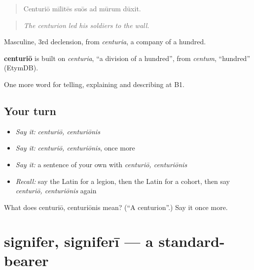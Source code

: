 \begin{quote}
Centuriō mīlitēs suōs ad mūrum dūxit.
\end{quote}

\begin{quote}
\emph{The centurion led his soldiers to the wall.}
\end{quote}

Masculine, 3rd declension, from \emph{centuria}, a company of a hundred.

\begin{cousinweb}
\textbf{centuriō} is built on \emph{centuria}, \textquotedblleft{}a division of a hundred\textquotedblright{}, from \emph{centum}, \textquotedblleft{}hundred\textquotedblright{} (EtymDB).
\end{cousinweb}

\begin{grammarlens}[title={What you've built}]
One more word for telling, explaining and describing at B1.
\end{grammarlens}

\subsection*{Your turn}
\begin{itemize}
\raggedright
  \item \emph{Say it:} \emph{centuriō, centuriōnis}
  \item \emph{Say it:} \emph{centuriō, centuriōnis}, once more
  \item \emph{Say it:} a sentence of your own with \emph{centuriō, centuriōnis}
  \item \emph{Recall:} say the Latin for a legion, then the Latin for a cohort, then say \emph{centuriō, centuriōnis} again
\end{itemize}

\begin{tcolorbox}[breakable,colback=teal!4,colframe=teal!35!black,title={Before you move on}]
What does centuriō, centuriōnis mean? (\textquotedblleft{}A centurion\textquotedblright{}.) Say it once more.
\end{tcolorbox}
\section[signifer, signiferī]{signifer, signiferī — a standard-bearer}

\label{lesson:LA-C338-signifer}



